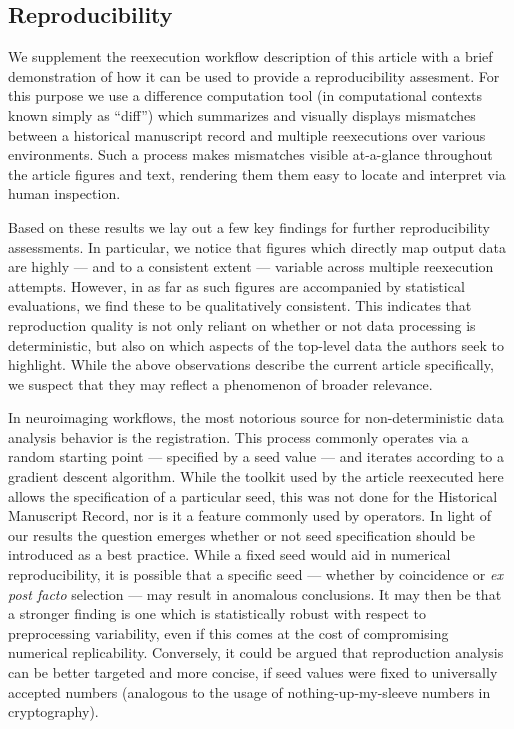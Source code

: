 \subsection{Reproducibility}


We supplement the reexecution workflow description of this article with a brief demonstration of how it can be used to provide a reproducibility assesment.
For this purpose we use a difference computation tool (in computational contexts known simply as “diff”) which summarizes and visually displays mismatches between a historical manuscript record and multiple reexecutions over various environments.
Such a process makes mismatches visible at-a-glance throughout the article figures and text, rendering them them easy to locate and interpret via human inspection.

Based on these results we lay out a few key findings for further reproducibility assessments.
In particular, we notice that figures which directly map output data are highly — and to a consistent extent — variable across multiple reexecution attempts.
However, in as far as such figures are accompanied by statistical evaluations, we find these to be qualitatively consistent.
This indicates that reproduction quality is not only reliant on whether or not data processing is deterministic, but also on which aspects of the top-level data the authors seek to highlight.
While the above observations describe the current article specifically, we suspect that they may reflect a phenomenon of broader relevance.

In neuroimaging workflows, the most notorious source for non-deterministic data analysis behavior is the registration.
This process commonly operates via a random starting point — specified by a seed value — and iterates according to a gradient descent algorithm.
While the toolkit used by the article reexecuted here allows the specification of a particular seed, this was not done for the Historical Manuscript Record, nor is it a feature commonly used by operators.
In light of our results the question emerges whether or not seed specification should be introduced as a best practice.
While a fixed seed would aid in numerical reproducibility, it is possible that a specific seed — whether by coincidence or \textit{ex post facto} selection — may result in anomalous conclusions.
It may then be that a stronger finding is one which is statistically robust with respect to preprocessing variability, even if this comes at the cost of compromising numerical replicability.
Conversely, it could be argued that reproduction analysis can be better targeted and more concise, if seed values were fixed to universally accepted numbers (analogous to the usage of nothing-up-my-sleeve numbers in cryptography).

